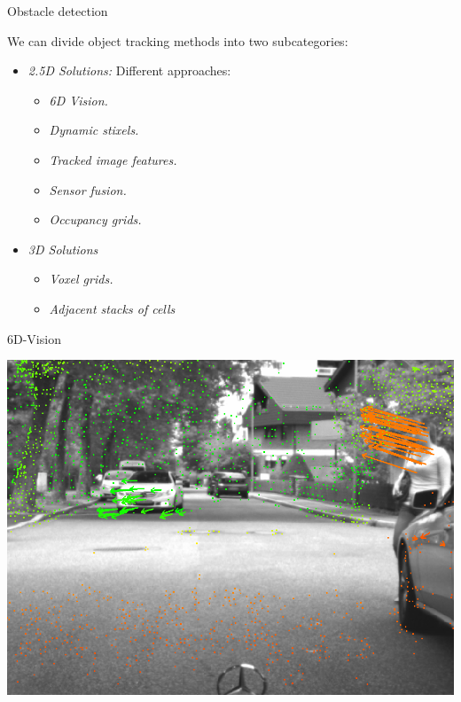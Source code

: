   \begin{frame}[plain]{Obstacle detection}
    \begin{overlayarea}{\textwidth}{\textheight}
       {
	We can divide object tracking methods into two subcategories:
	\begin{itemize}
	  \item \emph{2.5D Solutions:} Different approaches:
	  \begin{itemize}
	    \item \emph{6D Vision.} \cite{franke20056d}
	    \item \emph{Dynamic stixels.} \cite{badino2009stixel, pfeiffer2011towards, pfeiffer2013exploiting, benenson2011stixels, benenson2012pedestrian, benenson2012fast}
	    \item \emph{Tracked image features.} \cite{barth2009estimating}
	    \item \emph{Sensor fusion.} \cite{wu2009collision}
	    \item \emph{Occupancy grids.} \cite{danescu2012particle}
	  \end{itemize} 
	  \item \emph{3D Solutions}
	  \begin{itemize}
	    \item \emph{Voxel grids.} \cite{broggi2013}
	    \item \emph{Adjacent stacks of cells} \cite{Moravec96robotspatial}
	  \end{itemize}
	\end{itemize}
      }
    \end{overlayarea}
    \begin{overlayarea}{\textwidth}{\textheight}
       {
	\vspace{-4.5cm}
	\begin{block}{6D-Vision}
	  \begin{center}
	    \includegraphics[height=0.5\textheight]{6dvision}

\end{center}
\end{block}}
\end{overlayarea}
\end{frame}
